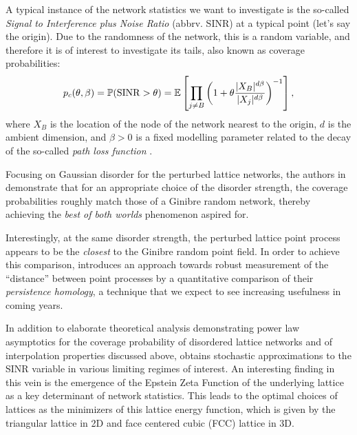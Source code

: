 A typical instance of the network statistics we want to investigate is the so-called \textit{Signal to Interference plus Noise Ratio} (abbrv. SINR) at a typical point (let's say the origin). Due to the randomness of the network, this is a random variable, and therefore it is of interest to investigate its tails, also known as coverage probabilities:
\begin{equation} \label{eq:infiniteprod_d}
p_c(\theta, \beta) =  \mathbb{P}(\mathrm{SINR} > \theta)
= \mathbb{E}\left[\prod_{j \not= B} \left(1 +\theta
 \frac{|X_B|^{d\beta}}{|X_j|^{d\beta}}  \right)^{-1}
\right],
\end{equation} 
where $X_B$ is the location of the node of the network nearest to the origin, $d$ is the ambient dimension, and $\beta>0$ is a fixed modelling parameter related to the decay of the so-called \textit{path loss function} \cite{Baccelli-Blasz, shirai-miyoshi}.

Focusing on Gaussian disorder for the perturbed lattice networks, the authors in \cite{ghosh-shirai} demonstrate that for an appropriate choice of the disorder strength, the coverage probabilities roughly match those of a Ginibre random network, thereby achieving the \textit{best of both worlds} phenomenon aspired for. 

Interestingly, at the same disorder strength, the perturbed lattice point process appears to be the \textit{closest} to the Ginibre random point field. In order to achieve this comparison, \cite{ghosh-shirai} introduces an approach towards robust measurement of the ``distance'' between point processes by a quantitative comparison of their \textit{persistence homology}, a technique that we expect to see increasing usefulness in coming years. 

In addition to elaborate theoretical analysis demonstrating power law asymptotics for the coverage probability of disordered lattice networks and of interpolation properties discussed above, \cite{ghosh-shirai} obtains stochastic approximations to the SINR variable in various limiting regimes of interest. An interesting finding in this vein is the emergence of the Epstein Zeta Function of the underlying lattice as a key determinant of network statistics. This leads to the optimal choices of lattices as the minimizers of this lattice energy function, which is given by the triangular lattice in 2D and face centered cubic (FCC) lattice in 3D. 

